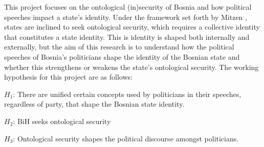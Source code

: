 This project focuses on the ontological (in)security of Bosnia and how political speeches impact a state's identity. Under the framework set forth by Mitzen \parencite*[][p. 344]{mitzenOntologicalSecurityWorld2006}, states are inclined to seek ontological security, which requires a collective identity that constitutes a state identity. This is identity is shaped both internally and externally, but the aim of this research is to understand how the political speeches of Bosnia's politicians shape the identity of the Bosnian state and whether this strengthens or weakens the state's ontological security. The working hypothesis for this project are as follows:

\begin{description}
    \item $H_1$: There are unified certain concepts used by politicians in their speeches, regardless of party, that shape the Bosnian state identity.
    \item $H_2$: BiH seeks ontological security
    \item $H_3$: Ontological security shapes the political discourse amongst politicians.
\end{description}